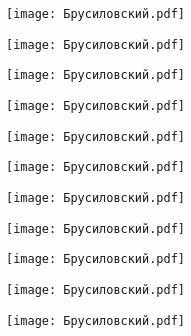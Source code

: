 \documentclass[main.tex]{subfiles}
\begin{document}
\begin{center}
\texttt{[image: Брусиловский.pdf]}
\end{center}

\begin{center}
\texttt{[image: Брусиловский.pdf]}
\end{center}

\begin{center}
\texttt{[image: Брусиловский.pdf]}
\end{center}

\begin{center}
\texttt{[image: Брусиловский.pdf]}
\end{center}

\begin{center}
\texttt{[image: Брусиловский.pdf]}
\end{center}

\begin{center}
\texttt{[image: Брусиловский.pdf]}
\end{center}

\begin{center}
\texttt{[image: Брусиловский.pdf]}
\end{center}

\begin{center}
\texttt{[image: Брусиловский.pdf]}
\end{center}

\begin{center}
\texttt{[image: Брусиловский.pdf]}
\end{center}

\begin{center}
\texttt{[image: Брусиловский.pdf]}
\end{center}

\begin{center}
\texttt{[image: Брусиловский.pdf]}
\end{center}
\end{document}
